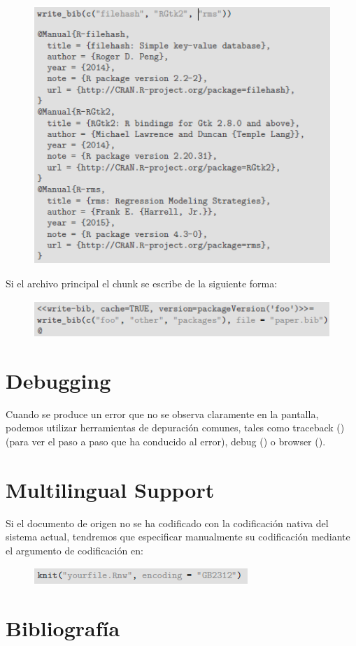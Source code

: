 \documentclass[10pt]{article}   			%
\begin{document}
\begin{figure}[ht] 
	\centering
		\includegraphics[scale=1]{Citation}
		\label{fig:Citation}
\end{figure}

Si el archivo principal el chunk se escribe de la siguiente forma:

\begin{figure}[ht] 
	\centering
		\includegraphics[scale=1.1]{Citation2} 
		\label{fig:Citation2}
\end{figure}

\newpage	
\section{Debugging}

Cuando se produce un error que no se observa claramente en la pantalla, podemos utilizar herramientas de depuración comunes, tales como traceback () (para ver el paso a paso que ha conducido al error), debug () o browser ().

\section{Multilingual Support}
		
Si el documento de origen no se ha codificado con la codificación nativa del sistema actual, tendremos que especificar manualmente su codificación mediante el argumento de codificación en:

\begin{figure}[ht] 
	\centering
		\includegraphics[scale=1.6]{Support}
		\label{fig:Support}
\end{figure}

\section{Bibliografía}	

\nocite{*}
\end{document}
